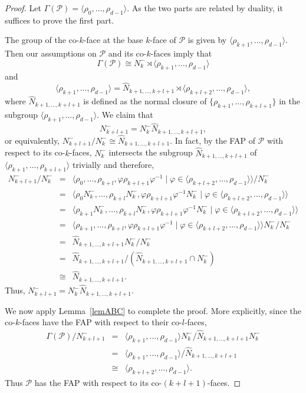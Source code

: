 \documentclass[10pt,a4paper]{amsart}
\theoremstyle{definition}
\begin{document}
\begin{proof}
Let $\Gamma(\mathcal{P}) = \langle\rho_{0},\ldots,\rho_{d-1}\rangle$. As the two parts are related by duality, it suffices to prove the first part. 

The group of the co-$k$-face at the base $k$-face of $\mathcal{P}$ is given by $\langle\rho_{k+1},\ldots,\rho_{d-1}\rangle$. Then our assumptions on $\mathcal{P}$ and its co-$k$-faces imply that 
\[\Gamma(\mathcal{P}) \cong N_{k}^{-} \rtimes \langle\rho_{k+1},\ldots,\rho_{d-1}\rangle\]
and
\[\langle\rho_{k+1},\ldots,\rho_{d-1}\rangle =
\hat{N}_{k+1,\ldots,k+l+1} \rtimes \langle\rho_{k+l+2},\ldots,\rho_{d-1}\rangle,\]
where $\hat{N}_{k+1,\ldots,k+l+1}$ is defined as the normal closure of $\{\rho_{k+1},\ldots,\rho_{k+l+1}\}$ in the subgroup $\langle\rho_{k+1},\ldots,\rho_{d-1}\rangle$. We claim that 
\begin{equation}
\label{herNs}
N_{k+l+1}^{-} = N_{k}^{-}\hat{N}_{k+1,\ldots,k+l+1},
\end{equation}
or equivalently, $N_{k+l+1}^{-}/N_{k}^{-}\cong \hat{N}_{k+1,\ldots,k+l+1}$.
In fact, by the FAP of $\mathcal{P}$ with respect to its co-$k$-faces, $N_k^{-}$ intersects the subgroup $\hat{N}_{k+1,\ldots,k+l+1}$  of $\langle\rho_{k+1},\ldots,\rho_{k+l+1}\rangle$ 
trivially and therefore, 
\[\begin{array}{rcl}
N_{k+l+1}^{-}/ N_{k}^{-}&= &
\langle\rho_{0},\ldots,\rho_{k+l},\varphi\rho_{k+l+1}\varphi^{-1}\!\mid\! \varphi\in\langle\rho_{k+l+2},\ldots,\rho_{d-1}\rangle\rangle/N_{k}^{-}\\
&=&
\langle\rho_{0}N_{k}^{-},\ldots,\rho_{k+l}N_{k}^{-},\varphi\rho_{k+l+1}\varphi^{-1}N_{k}^{-}\mid \varphi\in\langle\rho_{k+l+2},\ldots,\rho_{d-1}\rangle\rangle\\
&=&
\langle\rho_{k+1}N_{k}^{-},\ldots,\rho_{k+l}N_{k}^{-},\varphi\rho_{k+l+1}\varphi^{-1}N_{k}^{-}\mid \varphi\in\langle\rho_{k+l+2},\ldots,\rho_{d-1}\rangle\rangle\\
&=&
\langle\rho_{k+1},\ldots,\rho_{k+l},\varphi\rho_{k+l+1}\varphi^{-1}\mid \varphi\in\langle\rho_{k+l+2},\ldots,\rho_{d-1}\rangle\rangle N_{k}^{-}/N_{k}^{-}\\
&=&\hat{N}_{k+1,\ldots,k+l+1} N_{k}^{-}/N_{k}^{-}\\
&=&\hat{N}_{k+1,\ldots,k+l+1}/(\hat{N}_{k+1,\ldots,k+l+1}\cap N_{k}^{-})\\
&\cong&\hat{N}_{k+1,\ldots,k+l+1}.
\end{array}\]
Thus, $N_{k+l+1}^{-} = N_{k}^{-}\hat{N}_{k+1,\ldots,k+l+1}$.

We now apply Lemma~\ref{lemABC} to complete the proof. More explicitly, since the co-$k$-faces have the FAP with respect to their co-$l$-faces,
\[\begin{array}{rcl}
\Gamma(\mathcal{P})/N_{k+l+1}^{-}
&=&\langle\rho_{k+1},\ldots,\rho_{d-1}\rangle N_{k}^{-} / \hat{N}_{k+1,\ldots,k+l+1}N_{k}^{-} \\
&=&\langle\rho_{k+1},\ldots,\rho_{d-1}\rangle / \hat{N}_{k+1,\ldots,k+l+1}\\
&\cong&\langle\rho_{k+l+2},\ldots,\rho_{d-1}\rangle.
\end{array}\]
Thus $\mathcal{P}$ has the FAP with respect to its co-$(k+l+1)$-faces. 
\end{proof}
\medskip
\end{document}
